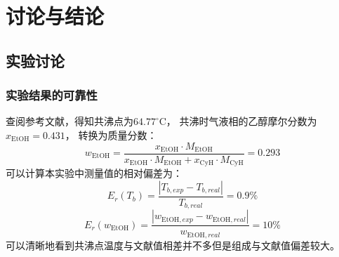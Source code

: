 \documentclass[12pt]{article}
\newcommand{\mr}[1]{\mathrm{#1}}
\def\celsius{^{\circ}\mr{C}}  %
\begin{document}
 	\section{讨论与结论}
		\subsection{实验讨论}
		\subsubsection{实验结果的可靠性}
		查阅参考文献\citealp{doi:10.1021/je60019a024}，得知共沸点为$64.77\celsius$，
		共沸时气液相的乙醇摩尔分数为$x_{\mr{EtOH}} = 0.431$，
		转换为质量分数：
		\begin{equation}
			w_{\mr{EtOH}} = \frac{x_{\mr{EtOH}}\cdot M_{\mr{EtOH}}}{x_{\mr{EtOH}}\cdot M_{\mr{EtOH}} + x_{\mr{CyH}}\cdot M_{\mr{CyH}}}
			= 0.293
		\end{equation}
		可以计算本实验中测量值的相对偏差为：
		\begin{equation}
			E_r(T_b) = \dfrac{|T_{b,exp} - T_{b,real}|}{T_{b,real}} = 0.9\%
		\end{equation}
		\begin{equation}
			E_r(w_{\mr{EtOH}}) = \dfrac{|w_{\mr{EtOH},exp} - w_{\mr{EtOH},real}|}{w_{\mr{EtOH},real}} = 10\%
		\end{equation}
		可以清晰地看到共沸点温度与文献值相差并不多但是组成与文献值偏差较大。
\end{document}
